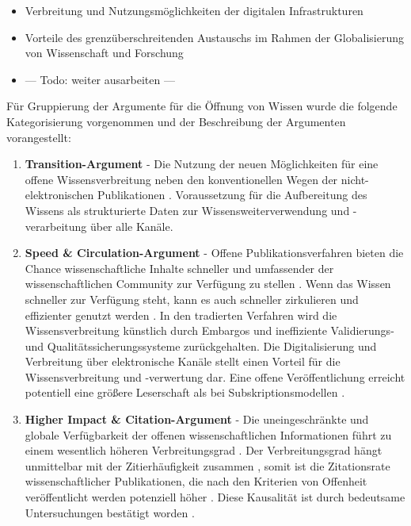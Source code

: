 \begin{itemize}
\item Verbreitung und Nutzungsmöglichkeiten der digitalen Infrastrukturen
\item Vorteile des grenzüberschreitenden Austauschs im Rahmen der Globalisierung von Wissenschaft und Forschung
\item --- Todo: weiter ausarbeiten ---
\end{itemize}

Für Gruppierung der Argumente für die Öffnung von Wissen wurde die folgende Kategorisierung vorgenommen und der Beschreibung der Argumenten vorangestellt:
\begin{enumerate}
\item \textbf{Transition-Argument} - Die Nutzung der neuen Möglichkeiten für eine offene Wissensverbreitung neben den konventionellen Wegen der nicht-elektronischen Publikationen \cite{berliner_erklaerung_2003}. Voraussetzung für die Aufbereitung des Wissens als strukturierte Daten zur Wissensweiterverwendung und -verarbeitung über alle Kanäle.
\item \textbf{Speed & Circulation-Argument} - Offene Publikationsverfahren bieten die Chance wissenschaftliche Inhalte schneller und umfassender der wissenschaftlichen Community zur Verfügung zu stellen \cite{muller_2010_open}. Wenn das Wissen schneller zur Verfügung steht, kann es auch schneller zirkulieren und effizienter genutzt werden \cite{Woelfle_2011}. In den tradierten Verfahren wird die Wissensverbreitung künstlich durch Embargos und ineffiziente Validierungs- und Qualitätssicherungssysteme zurückgehalten. Die Digitalisierung und Verbreitung über elektronische Kanäle stellt einen Vorteil für die Wissensverbreitung und -verwertung dar. Eine offene Veröffentlichung erreicht potentiell eine größere Leserschaft als bei Subskriptionsmodellen \cite{cope2014future}.
\item \textbf{Higher Impact & Citation-Argument} - Die uneingeschränkte und globale Verfügbarkeit der offenen wissenschaftlichen Informationen führt zu einem wesentlich höheren Verbreitungsgrad \cite{muller_2010_open}. Der Verbreitungsgrad hängt unmittelbar mit der Zitierhäufigkeit zusammen \cite{muller_2010_open}, somit ist die Zitationsrate wissenschaftlicher Publikationen, die nach den Kriterien von Offenheit veröffentlicht werden potenziell höher \cite{cite:21a}. Diese Kausalität ist durch bedeutsame Untersuchungen bestätigt worden \cite{Lawrence_2001} \cite{Jeffrey_2008} \cite{Eysenbach_2006} \cite{Antelman_2004}.

\end{enumerate}
